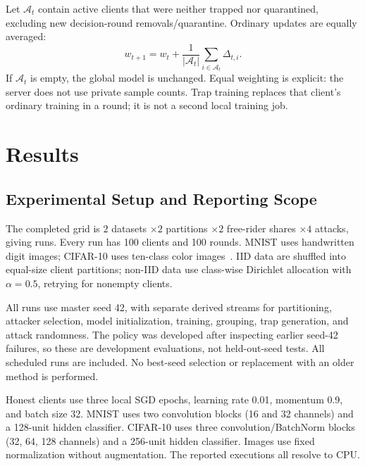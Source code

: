 \documentclass[conference]{IEEEtran}
\begin{document}
Let $\mathcal A_t$ contain active clients that were neither trapped nor
quarantined, excluding new decision-round removals/quarantine. Ordinary updates
are equally averaged:
\begin{equation}
 w_{t+1}=w_t+\frac{1}{|\mathcal A_t|}\sum_{i\in\mathcal A_t}\Delta_{t,i}.
\end{equation}
If $\mathcal A_t$ is empty, the global model is unchanged. Equal weighting is
explicit: the server does not use private sample counts. Trap training replaces
that client's ordinary training in a round; it is not a second local training job.

\section{Results}
\subsection{Experimental Setup and Reporting Scope}
The completed grid is
$2$ datasets $\times 2$ partitions $\times 2$ free-rider shares $\times 4$ attacks,
giving \StudyRuns{} runs. Every run has 100 clients and 100 rounds. MNIST uses
handwritten digit images; CIFAR-10 uses ten-class color images~\cite{lecun1998gradient,krizhevsky2009learning}.
IID data are shuffled into equal-size client partitions; non-IID data use
class-wise Dirichlet allocation with $\alpha=0.5$, retrying for nonempty clients.

All runs use master seed 42, with separate derived streams for partitioning,
attacker selection, model initialization, training, grouping, trap generation,
and attack randomness. The policy was developed after inspecting earlier
seed-42 failures, so these are development evaluations, not held-out-seed tests.
All scheduled runs are included. No best-seed selection or replacement with an
older method is performed.

Honest clients use three local SGD epochs, learning rate 0.01, momentum 0.9,
and batch size 32. MNIST uses two convolution blocks (16 and 32 channels) and
a 128-unit hidden classifier. CIFAR-10 uses three convolution/BatchNorm blocks
(32, 64, 128 channels) and a 256-unit hidden classifier. Images use fixed
normalization without augmentation. The reported executions all resolve to CPU.
\end{document}
